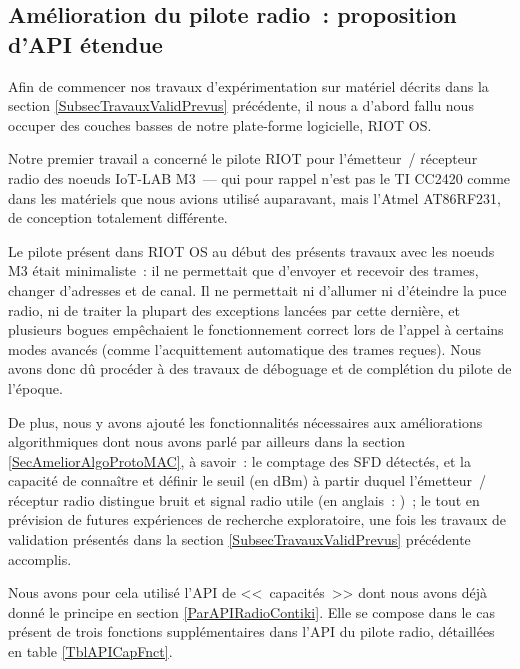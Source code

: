 \subsection{Amélioration du pilote radio~: proposition d'API étendue}
\label{SubsecAPIRadioExt}

Afin de commencer nos travaux d'expérimentation sur matériel décrits dans
la section \ref{SubsecTravauxValidPrevus} précédente, il nous a d'abord fallu
nous occuper des couches basses de notre plate-forme logicielle, RIOT OS.

Notre premier travail a concerné le pilote RIOT pour l'émetteur~/ récepteur
radio des noeuds IoT-LAB M3~--- qui pour rappel n'est pas le TI CC2420
comme dans les matériels que nous avions utilisé auparavant, mais
l'Atmel AT86RF231, de conception totalement différente.

Le pilote présent dans RIOT OS au début des présents travaux avec les
noeuds M3 était minimaliste~: il ne permettait que d'envoyer et recevoir
des trames, changer d'adresses et de canal. Il ne permettait ni d'allumer
ni d'éteindre la puce radio, ni de traiter la plupart des exceptions lancées
par cette dernière, et plusieurs bogues empêchaient le fonctionnement correct
lors de l'appel à certains modes avancés (comme l'acquittement automatique
des trames reçues). Nous avons donc dû procéder à des travaux de déboguage
et de complétion du pilote de l'époque. 

De plus, nous y avons ajouté les fonctionnalités nécessaires aux
améliorations algorithmiques dont nous avons parlé par ailleurs dans la
section \vref{SecAmeliorAlgoProtoMAC}, à savoir~: le comptage des SFD
détectés, et la capacité de connaître et définir le seuil (en dBm) à partir
duquel l'émetteur~/ réceptur radio distingue bruit et signal radio utile
(en anglais~: )~; le tout en prévision de futures
expériences de recherche exploratoire, une fois les travaux de validation
présentés dans la section \ref{SubsecTravauxValidPrevus} précédente
accomplis.

Nous avons pour cela utilisé l'API de <<~capacités~>> dont nous avons
déjà donné le principe en section \vref{ParAPIRadioContiki}. Elle se compose
dans le cas présent de trois fonctions supplémentaires dans l'API du pilote
radio, détaillées en table \vref{TblAPICapFnct}.


